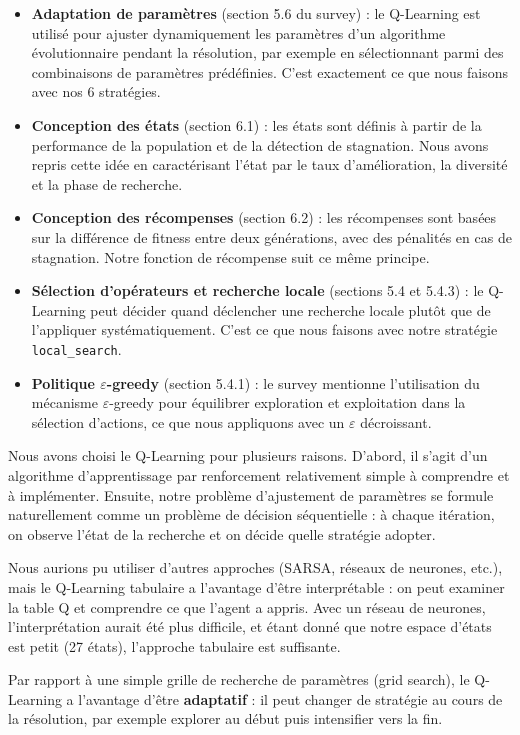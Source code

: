 \documentclass[12pt, a4paper]{article}
\begin{document}
\begin{itemize}
    \item \textbf{Adaptation de paramètres} (section 5.6 du survey) : le Q-Learning est utilisé pour ajuster dynamiquement les paramètres d'un algorithme évolutionnaire pendant la résolution, par exemple en sélectionnant parmi des combinaisons de paramètres prédéfinies. C'est exactement ce que nous faisons avec nos 6 stratégies.
    \item \textbf{Conception des états} (section 6.1) : les états sont définis à partir de la performance de la population et de la détection de stagnation. Nous avons repris cette idée en caractérisant l'état par le taux d'amélioration, la diversité et la phase de recherche.
    \item \textbf{Conception des récompenses} (section 6.2) : les récompenses sont basées sur la différence de fitness entre deux générations, avec des pénalités en cas de stagnation. Notre fonction de récompense suit ce même principe.
    \item \textbf{Sélection d'opérateurs et recherche locale} (sections 5.4 et 5.4.3) : le Q-Learning peut décider quand déclencher une recherche locale plutôt que de l'appliquer systématiquement. C'est ce que nous faisons avec notre stratégie \texttt{local\_search}.
    \item \textbf{Politique $\varepsilon$-greedy} (section 5.4.1) : le survey mentionne l'utilisation du mécanisme $\varepsilon$-greedy pour équilibrer exploration et exploitation dans la sélection d'actions, ce que nous appliquons avec un $\varepsilon$ décroissant.
\end{itemize}

Nous avons choisi le Q-Learning pour plusieurs raisons. D'abord, il s'agit d'un algorithme d'apprentissage par renforcement relativement simple à comprendre et à implémenter. Ensuite, notre problème d'ajustement de paramètres se formule naturellement comme un problème de décision séquentielle : à chaque itération, on observe l'état de la recherche et on décide quelle stratégie adopter.

Nous aurions pu utiliser d'autres approches (SARSA, réseaux de neurones, etc.), mais le Q-Learning tabulaire a l'avantage d'être interprétable : on peut examiner la table Q et comprendre ce que l'agent a appris. Avec un réseau de neurones, l'interprétation aurait été plus difficile, et étant donné que notre espace d'états est petit (27 états), l'approche tabulaire est suffisante.

Par rapport à une simple grille de recherche de paramètres (grid search), le Q-Learning a l'avantage d'être \textbf{adaptatif} : il peut changer de stratégie au cours de la résolution, par exemple explorer au début puis intensifier vers la fin.
\end{document}
